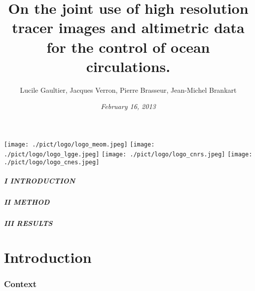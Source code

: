 \documentclass[compress,slidescentered,notes=show]{beamer}
\title{On the joint use of high resolution tracer images \hspace{4cm} and altimetric data for the control of ocean circulations.}
\author[S\'eminaire LPO]{Lucile Gaultier, Jacques Verron, Pierre Brasseur, Jean-Michel Brankart}
\date{\textit{February 16, 2013}}
\begin{document}
\begin{frame}
  \maketitle
{}
  \begin{center}
    \texttt{[image: ./pict/logo/logo\_meom.jpeg]}
    \hspace{0.5cm}
    \texttt{[image: ./pict/logo/logo\_lgge.jpeg]}
    \hspace{0.5cm}
    \texttt{[image: ./pict/logo/logo\_cnrs.jpeg]}
    \hspace{0.5cm}
    \texttt{[image: ./pict/logo/logo\_cnes.jpeg]}
  \end{center}

  \note{
}
\end{frame}

\logo{\insertframenumber/\inserttotalframenumber}
\begin{frame}
  \frametitle{I INTRODUCTION}
   
  \tableofcontents[part=1] %
\end{frame}
\begin{frame}
  \frametitle{II METHOD}
  
  \tableofcontents[part=2] %
\end{frame}
\begin{frame}
  \frametitle{III RESULTS}
  \tableofcontents[part=3] %
\end{frame}

\part{Introduction}

\section{Context}%
\begin{frame}
  \frametitle{\insertromanpartnumber \hspace{1em} \insertpart}
  
  \tableofcontents[hideothersections]
\end{frame}
\end{document}
